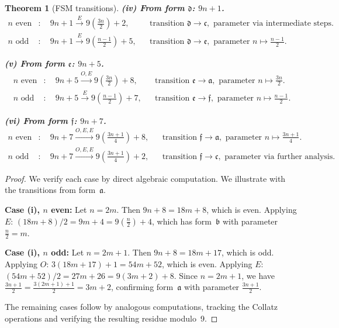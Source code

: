 \documentclass[10pt,a4paper]{amsart}
\newtheorem{theorem}{Theorem}
\begin{document}
\begin{theorem}[FSM transitions]
  \medskip
  \noindent\textbf{(iv) From form $\mathfrak{d}$: $9n+1$.}
  \begin{align}
    n \text{ even} &: \quad 9n+1 \xrightarrow{E} 9\!\left(\tfrac{3n}{2}\right)+2, && \text{transition } \mathfrak{d} \to \mathfrak{c}, \text{ parameter via intermediate steps.} \label{eq:d_even} \\
    n \text{ odd} &: \quad 9n+1 \xrightarrow{E} 9\!\left(\tfrac{n-1}{2}\right)+5, && \text{transition } \mathfrak{d} \to \mathfrak{e}, \text{ parameter } n \mapsto \tfrac{n-1}{2}. \label{eq:d_odd}
  \end{align}

  \medskip
  \noindent\textbf{(v) From form $\mathfrak{e}$: $9n+5$.}
  \begin{align}
    n \text{ even} &: \quad 9n+5 \xrightarrow{O,E} 9\!\left(\tfrac{3n}{2}\right)+8, && \text{transition } \mathfrak{e} \to \mathfrak{a}, \text{ parameter } n \mapsto \tfrac{3n}{2}. \label{eq:e_even} \\
    n \text{ odd} &: \quad 9n+5 \xrightarrow{E} 9\!\left(\tfrac{n-1}{2}\right)+7, && \text{transition } \mathfrak{e} \to \mathfrak{f}, \text{ parameter } n \mapsto \tfrac{n-1}{2}. \label{eq:e_odd}
  \end{align}

  \medskip
  \noindent\textbf{(vi) From form $\mathfrak{f}$: $9n+7$.}
  \begin{align}
    n \text{ even} &: \quad 9n+7 \xrightarrow{O,E,E} 9\!\left(\tfrac{3n+1}{4}\right)+8, && \text{transition } \mathfrak{f} \to \mathfrak{a}, \text{ parameter } n \mapsto \tfrac{3n+1}{4}. \label{eq:f_even} \\
    n \text{ odd} &: \quad 9n+7 \xrightarrow{O,E,E} 9\!\left(\tfrac{3n+1}{4}\right)+2, && \text{transition } \mathfrak{f} \to \mathfrak{c}, \text{ parameter via further analysis.} \label{eq:f_odd}
  \end{align}
\end{theorem}

\begin{proof}
  We verify each case by direct algebraic computation. We illustrate with the transitions from form~$\mathfrak{a}$.

  \textbf{Case (i), $n$ even:} Let $n = 2m$. Then $9n+8 = 18m+8$, which is even. Applying $E$: $(18m+8)/2 = 9m+4 = 9(\tfrac{n}{2})+4$, which has form~$\mathfrak{b}$ with parameter $\tfrac{n}{2} = m$.

  \textbf{Case (i), $n$ odd:} Let $n = 2m+1$. Then $9n+8 = 18m+17$, which is odd. Applying $O$: $3(18m+17)+1 = 54m+52$, which is even. Applying $E$: $(54m+52)/2 = 27m+26 = 9(3m+2)+8$. Since $n = 2m+1$, we have $\tfrac{3n+1}{2} = \tfrac{3(2m+1)+1}{2} = 3m+2$, confirming form~$\mathfrak{a}$ with parameter $\tfrac{3n+1}{2}$.

  The remaining cases follow by analogous computations, tracking the Collatz operations and verifying the resulting residue modulo~9.
\end{proof}
\end{document}
